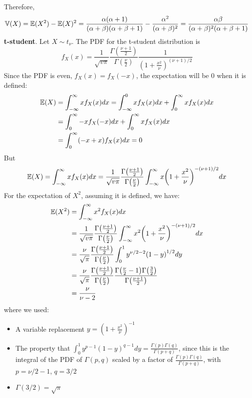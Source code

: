 Therefore,
\[
\operatorname{\mathbb{V}}(X) = \operatorname{\mathbb{E}}(X^{2}) - \operatorname{\mathbb{E}}(X)^{2} = \frac{\alpha (\alpha + 1)}{(\alpha + \beta)(\alpha + \beta + 1)} - \frac{\alpha^{2}}{(\alpha + \beta)^{2}} = \frac{\alpha \beta}{(\alpha + \beta)^{2} (\alpha + \beta + 1)}
\]
\textbf{t-student}. Let \(X \sim t_\nu\). The PDF for the t-student
distribution is
\[
f_X(x) = \frac{1}{\sqrt{v \pi}} \frac{\Gamma\left(\frac{\nu + 1}{2}\right)}{\Gamma\left(\frac{\nu}{2}\right)} \frac{1}{\left(1 + \frac{x^{2}}{\nu} \right)^{(\nu + 1)/2}}
\]
Since the PDF is even, \(f_X(x) = f_X(-x)\), the expectation will be 0
when it is defined:
\begin{align*}
\operatorname{\mathbb{E}}(X) 
& = \int_{-\infty}^{\infty} x f_X(x) dx 
  = \int_{-\infty}^{0} x f_X(x) dx + \int_{0}^{\infty} x f_X(x) dx 
\\
& = \int_{0}^{\infty} -x f_X(-x) dx + \int_{0}^{\infty} x f_X(x) dx 
\\
& = \int_{0}^{\infty} (-x + x)f_X(x) dx = 0
\end{align*}
But
\[
\EXP(X) = \int_{-\infty}^{\infty} x f_X(x) dx = \frac{1}{\sqrt{v \pi}} \frac{\Gamma\left(\frac{\nu + 1}{2}\right)}{\Gamma\left(\frac{\nu}{2}\right)} \int_{-\infty}^{\infty} x  \left(1 + \frac{x^{2}}{\nu} \right)^{-(\nu + 1)/2} dx
\]
For the expectation of \(X^{2}\), assuming it is defined, we have:
\begin{align*}
\EXP(X^{2}) &= \int_{-\infty}^{\infty} x^{2} f_X(x) dx \\
&= \frac{1}{\sqrt{v \pi}} \frac{\Gamma\left(\frac{\nu + 1}{2}\right)}{\Gamma\left(\frac{\nu}{2}\right)} \int_{-\infty}^{\infty} x^{2} \left( 1 + \frac{x^{2}}{\nu}\right)^{-(\nu + 1) / 2} dx \\
&= \frac{\nu}{\sqrt{\pi}} \frac{\Gamma\left(\frac{\nu + 1}{2}\right)}{\Gamma\left(\frac{\nu}{2}\right)} \int_{0}^{1} y^{\nu /2 - 2} \left( 1 - y \right)^{1 / 2} dy \\
&= \frac{\nu}{\sqrt{\pi}} \frac{\Gamma\left(\frac{\nu + 1}{2}\right)}{\Gamma\left(\frac{\nu}{2}\right)} \frac{\Gamma\left(\frac{\nu}{2} - 1\right) \Gamma\left(\frac{3}{2}\right)}{\Gamma\left(\frac{\nu + 1}{2}\right)} \\
&= \frac{\nu}{\nu - 2}
\end{align*}
where we used:
\begin{itemize}[tightlist]
\item
  A variable replacement \(y = \left( 1 + \frac{x^{2}}{\nu} \right)^{-1}\)
\item
  The property that
  \(\int_{0}^{1} y^{p - 1} (1 - y)^{q - 1} dy = \frac{\Gamma(p) \Gamma(q)}{\Gamma(p + q)}\),
  since this is the integral of the PDF of \(\Gamma(p, q)\) scaled by a
  factor of \(\frac{\Gamma(p) \Gamma(q)}{\Gamma(p + q)}\), with
  \(p = \nu / 2 - 1\), \(q = 3/2\)
\item
  \(\Gamma(3 / 2) = \sqrt{\pi}\)
\end{itemize}
